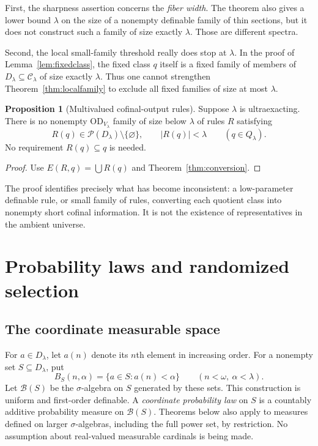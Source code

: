 \documentclass[11pt,letterpaper]{article}
\theoremstyle{definition}
\newtheorem{proposition}[definition]{Proposition}
\numberwithin{equation}{section}
\newcommand{\OD}{\mathrm{OD}}
\newcommand{\Pow}{\mathcal P}
\newcommand{\D}{D_\lambda}
\newcommand{\Q}{Q_\lambda}
\newcommand{\C}{\mathcal C_\lambda}
\begin{document}
First, the sharpness assertion concerns the \emph{fiber width}. The theorem also gives a lower bound $\lambda$ on the size of a nonempty definable family of thin sections, but it does not construct such a family of size exactly $\lambda$. Those are different spectra.

Second, the local small-family threshold really does stop at $\lambda$. In the proof of Lemma~\ref{lem:fixedclass}, the fixed class $q$ itself is a fixed family of members of $\D\subseteq\C$ of size exactly $\lambda$. Thus one cannot strengthen Theorem~\ref{thm:localfamily} to exclude all fixed families of size at most $\lambda$.

\begin{proposition}[Multivalued cofinal-output rules]\label{prop:multi}
Suppose $\lambda$ is ultraexacting. There is no nonempty $\OD_{V_\lambda}$ family of size below $\lambda$ of rules $R$ satisfying
\[
 R(q)\in\Pow(\D)\setminus\{\varnothing\},\qquad |R(q)|<\lambda
 \qquad(q\in\Q).
\]
No requirement $R(q)\subseteq q$ is needed.
\end{proposition}
\begin{proof}
Use $E(R,q)=\bigcup R(q)$ and Theorem~\ref{thm:conversion}.
\end{proof}

The proof identifies precisely what has become inconsistent: a low-parameter definable rule, or small family of rules, converting each quotient class into nonempty short cofinal information. It is not the existence of representatives in the ambient universe.

\section{Probability laws and randomized selection}\label{sec:prob}

\subsection{The coordinate measurable space}

For $a\in\D$, let $a(n)$ denote its $n$th element in increasing order. For a nonempty set $S\subseteq\D$, put
\[
 B_S(n,\alpha)=\{a\in S:a(n)<\alpha\}
 \qquad(n<\omega,\ \alpha<\lambda).
\]
Let $\mathscr B(S)$ be the $\sigma$-algebra on $S$ generated by these sets. This construction is uniform and first-order definable. A \emph{coordinate probability law} on $S$ is a countably additive probability measure on $\mathscr B(S)$. Theorems below also apply to measures defined on larger $\sigma$-algebras, including the full power set, by restriction. No assumption about real-valued measurable cardinals is being made.
\end{document}
